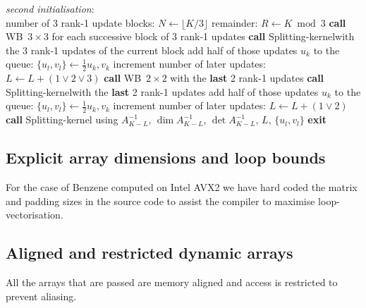 \documentclass[11pt]{article}
\numberwithin{figure}{section}
\numberwithin{table}{section}
\begin{document}
\begin{algorithm}[H]
	\textit{second initialisation}:\\
	number of 3 rank-1 update blocks: $N \gets \lfloor K/3\rfloor$\;
	remainder: $R\gets K\bmod{3}$\;
	 {
		\textbf{call} WB~$3\times 3$ for each successive block of 3 rank-1 updates\;
		 {
			\textbf{call} Splitting-kernel\footnotemark[1] with the 3 rank-1 updates of the current block\;
			 {
				add half of those updates $u_k$ to the queue: $\{u_l,v_l\} \gets \frac{1}{2}u_k, v_k$\;
				increment number of later updates: $L \gets L + (1 \lor 2 \lor 3)$\;
			}
		}
	}
	 {
		\textbf{call} WB~$2\times 2$ with the \textbf{last} 2 rank-1 updates\;
		 {
			\textbf{call} Splitting-kernel\footnotemark[1] with the \textbf{last} 2 rank-1 updates\;
			 {
				add half of those updates $u_k$ to the queue: $\{u_l,v_l\} \gets \frac{1}{2}u_k, v_k$\;
				increment number of later updates: $L \gets L + (1 \lor 2)$\;
			}
		}
	}
	{
		\textbf{call} Splitting-kernel\footnotemark[2] using $A^{-1}_{K-L}$, $\dim A^{-1}_{K-L}$, $\det A^{-1}_{K-L} $, $L$, $\{u_l, v_l\}$\;
	}
	\textbf{exit}\;
\end{algorithm}
			 
    \subsection{Explicit array dimensions and loop bounds}
    	For the case of Benzene computed on Intel AVX2 we have hard coded the matrix and padding sizes in the source code to assist the compiler to maximise loop-vectorisation. 
    	 			
    \subsection{Aligned and restricted dynamic arrays}
    	All the arrays that are passed are memory aligned and access is restricted to prevent aliasing.
    
\end{document}
